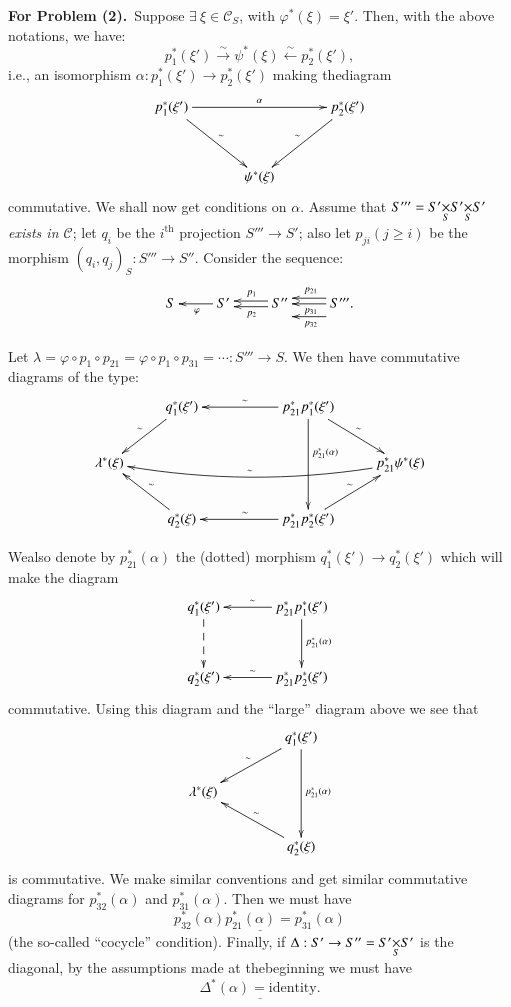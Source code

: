 \medskip
\noindent
{\bf For Problem (2).}~Suppose $\exists\ \xi\in\mathscr{C}_{S}$, with
$\varphi^{\ast}(\xi)=\xi'$. Then, with the above notations, we have:
$$
p^{\ast}_{1}(\xi')\xrightarrow{\sim}\psi^{\ast}(\xi)\xleftarrow{\sim}p^{\ast}_{2}(\xi'), 
$$
i.e., an isomorphism $\alpha:p^{\ast}_{1}(\xi')\to p^{\ast}_{2}(\xi')$
making the\pageoriginale diagram
\[
\xymatrix@=1.2cm{
p^{\ast}_{1}(\xi')\ar[dr]^{\sim}\ar[rr]^{\alpha} & &
p^{\ast}_{2}(\xi')\ar[dl]_{\sim}\\
 & \psi^{\ast}(\xi) 
}
\]
commutative. We shall now get conditions on $\alpha$. Assume that
$S'''=\fprod{S'}{\fprod{S'}{S'}{S}}{S}$ {\em exists in $\mathscr{C}$};
  let $q_{i}$ be the $i^{\text{th}}$ projection $S'''\to S'$; also let
  $p_{ji}(j\geq i)$ be the morphism $(q_{i},q_{j})_{S}:S'''\to
  S''$. Consider the sequence:
\[
\xymatrix{
S & \ar[l]^{\varphi}S' & \ar@<-.2em>[l]_{p_{1}}\ar@<.2em>[l]^{p_{2}}
S'' & \ar@<-.4em>[l]_{p_{21}}\ar[l]^{p_{31}}\ar@<.9em>[l]^{p_{32}} S'''.
}
\] 

Let $\lambda=\varphi\circ p_{1}\circ p_{21}=\varphi\circ p_{1}\circ
p_{31}=\cdots :S'''\to S$. We then have commutative diagrams of the
type:
\[
\xymatrix{
 & q^{\ast}_{1}(\xi')\ar[dl]_{\sim} && p^{\ast}_{21}
p^{\ast}_{1}(\xi')\ar[dd]^<<<<<<<<<{p^{\ast}_{21}(\alpha)}\ar[ll]_{\sim}\ar[dr]^{\sim} &\\
\lambda^{\ast}(\xi) & & & & p^{\ast}_{21}\psi^{\ast}(\xi)\ar@/^1em/[llll]_-{\sim}\\
 & q^{\ast}_{2}(\xi)\ar[ul]_{\sim} &&
p^{\ast}_{21}p^{\ast}_{2}(\xi')\ar[ll]_{\sim}\ar[ur]^{\sim} & 
}
\]

We\pageoriginale also denote by $p^{\ast}_{21}(\alpha)$ the (dotted)
morphism $q^{\ast}_{1}(\xi')\to q^{\ast}_{2}(\xi')$ which will make
the diagram
\[
\xymatrix@=1.2cm{
q^{\ast}_{1}(\xi')\ar@{-->}[d] &
p^{\ast}_{21}p^{\ast}_{1}(\xi')\ar[l]_{\sim}\ar[d]^{p^{\ast}_{21}(\alpha)}\\ 
q^{\ast}_{2}(\xi') & p^{\ast}_{21}p^{\ast}_{2}(\xi')\ar[l]_{\sim}
}
\]
commutative. Using this diagram and the ``large'' diagram above we see
that
\[
\xymatrix@C=1.5cm{
 & q^{\ast}_{1}(\xi')\ar[dd]^{p^{\ast}_{21}(\alpha)}\ar[dl]_{\sim}\\
\lambda^{\ast}(\xi) & \\
 & q^{\ast}_{2}(\xi)\ar[ul]_{\sim}
}
\]
is commutative. We make similar conventions and get similar
commutative diagrams for $p^{\ast}_{32}(\alpha)$ and
$p^{\ast}_{31}(\alpha)$. Then we must have
$$
\underline{p^{\ast}_{32}(\alpha)p^{\ast}_{21}(\alpha)=p^{\ast}_{31}(\alpha)}
$$
(the so-called ``cocycle'' condition). Finally, if $\Delta:S'\to
S''=\fprod{S'}{S'}{S}$ is the diagonal, by the assumptions made at 
the\pageoriginale beginning we must have
$$
\underline{\Delta^{\ast}(\alpha)=\text{identity}.}
$$

